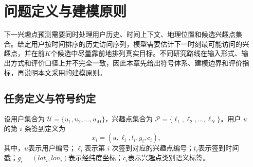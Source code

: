 \chapter{问题定义与建模原则}
\label{chap:related}

下一兴趣点预测需要同时处理用户历史、时间上下文、地理位置和候选兴趣点集合。给定用户按时间排序的历史访问序列，模型需要估计下一时刻最可能访问的兴趣点，并在前$K$个候选中尽量靠前地排列真实目标。不同研究路线在输入形式、输出方式和评价口径上并不完全一致，因此本章先给出符号体系、建模边界和评价指标，再说明本文采用的建模原则。

\section{任务定义与符号约定}
设用户集合为 $\mathcal{U}=\{u_1,u_2,\ldots,u_M\}$，兴趣点集合为 $\mathcal{P}=\{\ell_1,\ell_2,\ldots,\ell_N\}$。用户 $u$ 的第 $i$ 条签到定义为
\begin{equation}
x_i=(u,\ell_i,t_i,g_i,c_i),
\label{eq:c2-checkin}
\end{equation}
其中，$u$表示用户编号；$\ell_i$表示第 $i$ 次签到对应的兴趣点编号；$t_i$表示签到时间戳；$g_i=(lat_i,lon_i)$表示经纬度坐标；$c_i$表示兴趣点类别语义标签。

